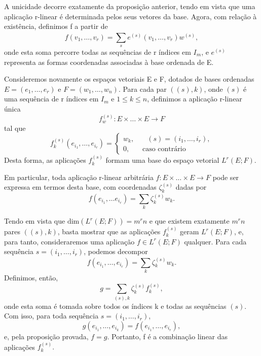 \documentclass[../differential_forms.tex]{subfiles}
\begin{document}
\begin{proof*}
  A unicidade decorre exatamente da proposição anterior, tendo em vista que uma aplicação r-linear é determinada pelos seus vetores da base. Agora, com relação à existência, definimos f a partir de 
    \[
      f(v_1,\dotsc ,v_r)=\sum\limits_{s}^{}e^{(s)}(v_1,\dotsc , v_r)w^{(s)}, 
    \]
    onde esta soma percorre todas as sequências de r índices em \(I_{m}\), e \(e^{(s)}\) representa as formas coordenadas associadas à base ordenada de E. \qedsymbol
\end{proof*}
\begin{prop*}
  Consideremos novamente os espaços vetoriais E e F, dotados de bases ordenadas \(E=(e_1,\dotsc , e_r)\) e \(F=(w_1,\dotsc ,w_n)\). Para cada par \(((s), k)\), onde \((s)\) é uma sequência de r índices em \(I_{m}\) e \(1\leq k\leq n\), definimos a aplicação r-linear única 
    \[
      f_{w}^{(s)}:E\times \dotsc \times E\rightarrow F
    \]
    tal que 
      \[
        f_{k}^{(s)}(e_{i_1},\dotsc ,e_{i_r}) = \left\{\begin{array}{ll}
            w_k,&\quad (s)=(i_1,\dotsc ,i_r),\\ 
            0,  &\text{ caso contrário}
          \end{array}\right.
      \]
      Desta forma, as aplicações \(f_{k}^{(s)}\) formam uma base do espaço vetorial \(L^{r}(E; F)\). 

      Em particular, toda aplicação r-linear arbitrária \(f:E\times \dotsc \times E\rightarrow F\) pode ser expressa em termos desta base, com coordenadas \(\zeta_{k}^{(s)}\) dadas por 
        \[
          f(e_{i_1},\dotsc e_{i_r})=\sum\limits_{k}^{}\zeta_{k}^{(s)}w_{k}.
        \]
\end{prop*}
\begin{proof*}
  Tendo em vista que \(\mathrm{dim}(L^{r}(E; F))=m^{r}n\) e que existem exatamente \(m^{r}n\) pares \(((s), k)\), basta mostrar que as aplicações \(f_{k}^{(s)}\) geram \(L^{r}(E; F)\), e, para tanto, consideraremos uma aplicação \(f\in L^{r}(E; F)\) qualquer. Para cada sequência \(s=(i_{1}, \dotsc , i_{r})\), podemos decompor 
    \[
      f(e_{i_1},\dotsc , e_{i_r})=\sum\limits_{k}^{}\zeta_{k}^{(s)}w_{k}.
    \]
    Definimos, então, 
      \[
        g = \sum\limits_{(s), k}^{}\zeta_{k}^{(s)}f_{k}^{(s)},
      \]
      onde esta soma é tomada sobre todos os índices k e todas as sequências \((s)\). Com isso, para toda sequência \(s=(i_1,\dotsc ,i_{r})\), 
        \[
          g(e_{i_1},\dotsc , e_{i_k})=f(e_{i_1},\dotsc , e_{i_r}),
        \]
        e, pela proposição provada, \(f=g\). Portanto, f é a combinação linear das aplicações \(f_{k}^{(s)}.\) \qedsymbol
\end{proof*}
\end{document}
